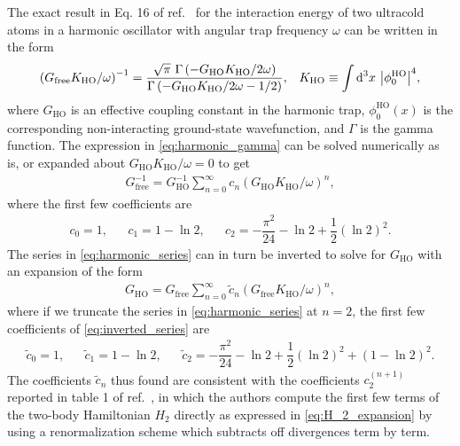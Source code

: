 \documentclass[preprint,showkeys,nofootinbib]{revtex4-1}
\renewcommand{\t}{\text} %
\newcommand{\f}{\dfrac} %
\newcommand{\p}[1]{\left(#1\right)} %
\renewcommand{\d}{\text{d}}
\newcommand{\1}{\mathds{1}}
\begin{document}
The exact result in Eq. 16 of ref.~\cite{busch1998two} for the
interaction energy of two ultracold atoms in a harmonic oscillator
with angular trap frequency $\omega$ can be written in the form
\begin{align}
  \p{G_{\t{free}} K_{\t{HO}}/\omega}^{-1}
  = \f{\sqrt{\pi}~ \Gamma\p{-G_{\t{HO}}K_{\t{HO}}/2\omega}}
  {\Gamma\p{-G_{\t{HO}}K_{\t{HO}}/2\omega-1/2}},
  &&
  K_{\t{HO}} \equiv \int \d^3x~ \abs{\phi_0^{\t{HO}}}^4,
  \label{eq:harmonic_gamma}
\end{align}
where $G_{\t{HO}}$ is an effective coupling constant in the harmonic
trap, $\phi_0^{\t{HO}}\p{x}$ is the corresponding non-interacting
ground-state wavefunction, and $\Gamma$ is the gamma function.  The
expression in \eqref{eq:harmonic_gamma} can be solved numerically as
is, or expanded about $G_{\t{HO}}K_{\t{HO}}/\omega=0$ to get
\begin{align}
  G_{\t{free}}^{-1} = G_{\t{HO}}^{-1}
  \sum_{n=0}^\infty c_n \p{G_{\t{HO}}K_{\t{HO}}/\omega}^n,
  \label{eq:harmonic_series}
\end{align}
where the first few coefficients are
\begin{align}
  c_0 = 1,
  &&
  c_1 = 1 - \ln 2,
  &&
  c_2 = -\f{\pi^2}{24} - \ln 2 + \f12 \p{\ln 2}^2.
\end{align}
The series in \eqref{eq:harmonic_series} can in turn be inverted to
solve for $G_{\t{HO}}$ with an expansion of the form
\begin{align}
  G_{\t{HO}} = G_{\t{free}}
  \sum_{n=0}^\infty \tilde c_n \p{G_{\t{free}}K_{\t{HO}}/\omega}^n,
  \label{eq:inverted_series}
\end{align}
where if we truncate the series in \eqref{eq:harmonic_series} at
$n=2$, the first few coefficients of \eqref{eq:inverted_series} are
\begin{align}
  \tilde c_0 = 1,
  &&
  \tilde c_1 = 1 - \ln 2,
  &&
  \tilde c_2 = -\f{\pi^2}{24} - \ln 2 + \f12 \p{\ln 2}^2
  + \p{1 - \ln 2}^2.
  \label{eq:inverted_coefficients}
\end{align}
The coefficients $\tilde c_n$ thus found are consistent with the
coefficients $c_2^{(n+1)}$ reported in table 1 of
ref.~\cite{johnson2012effective}, in which the authors compute the
first few terms of the two-body Hamiltonian $H_2$ directly as
expressed in \eqref{eq:H_2_expansion} by using a renormalization
scheme which subtracts off divergences term by term.
\end{document}
